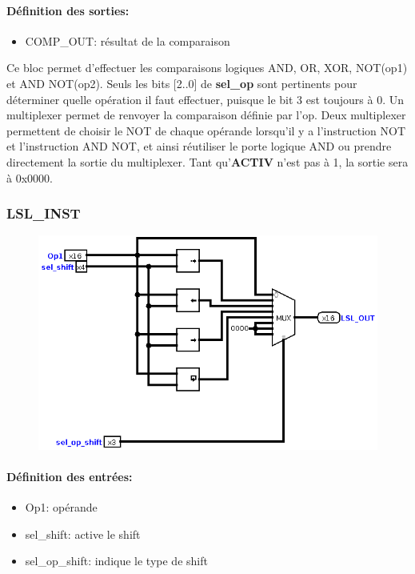 \documentclass[a4paper]{article} %
\begin{document}
\paragraph{Définition des sorties:}
\begin{itemize}
    \item     COMP\_OUT: résultat de la comparaison
\end{itemize}
\medskip
Ce bloc permet d'effectuer les comparaisons logiques AND, OR, XOR, NOT(op1) et AND NOT(op2). Seuls les bits [2..0] de \textbf{sel\_op} sont pertinents pour déterminer quelle opération il faut effectuer, puisque le bit 3 est toujours à 0. Un multiplexer permet de renvoyer la comparaison définie par l'op. Deux multiplexer permettent de choisir le NOT de chaque opérande lorsqu'il y a l'instruction NOT et l'instruction AND NOT, et ainsi réutiliser le porte logique AND ou prendre directement la sortie du multiplexer. Tant qu'\textbf{ACTIV} n'est pas à 1, la sortie sera à 0x0000.

\subsubsection{LSL\_INST}
\begin{figure}[H]
    \centering
    \includegraphics[width=.8\textwidth]{src/LSL_INST.png}
    \label{fig:lsl_inst_pic}
\end{figure}
\paragraph{Définition des entrées:}
\begin{itemize}
    \item     Op1: opérande
    \item     sel\_shift: active le shift
    \item     sel\_op\_shift: indique le type de shift
\end{itemize}
\end{document}
